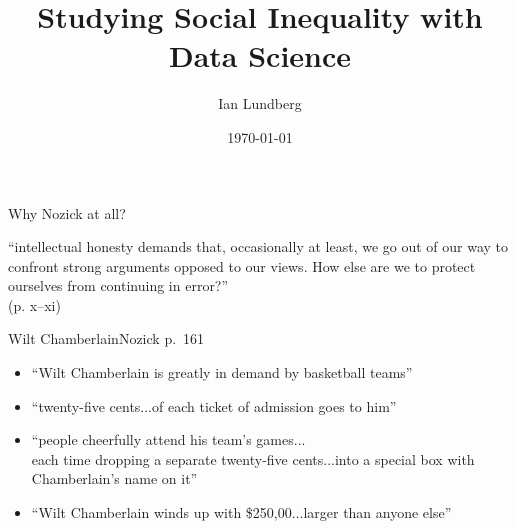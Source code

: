 \documentclass{beamer}
\title{Studying Social Inequality with Data Science}
\author{Ian Lundberg}
\date{\today}
\newcommand\bblue[1]{\textcolor{blue}{\textbf{#1}}}
\newcommand{\goalsframe}{\begin{frame}{Learning goals for today} \pause
By the end of class, you will be able to \vskip .1in
\begin{itemize}
    \item justify a minimal state \hfill (per Nozick) \vskip .1in \pause
    \item critique any more extensive state\\on the grounds of individual rights \hfill (per Nozick) \vskip .1in \pause
    \item draw contrasts between
    \begin{itemize}
    \item historical principles of justice \hfill Nozick
    \item end-state principles of justice \hfill Rawls
    \end{itemize} \vskip .1in \pause
    \item recognize how these different logics could\\both lead to redistribution today
    \begin{itemize}
    \item Example: Correcting past injustice
    \end{itemize}
\end{itemize} \vskip .2in
\end{frame}}
\begin{document}
\begin{frame}
\end{frame}


\begin{frame}{Why Nozick at all?} \pause

``intellectual honesty demands that, occasionally at least, we go out of our way to confront strong arguments opposed to our views. How else are we to protect ourselves from continuing in error?''\\(p. x--xi)

\end{frame}

\begin{frame}{Wilt Chamberlain}{Nozick p.~161} \pause

\begin{itemize}
\item ``Wilt Chamberlain is greatly in demand by basketball teams'' \pause
\item ``twenty-five cents...of each ticket of admission goes to him'' \pause
\item ``people cheerfully attend his team's games...\\each time dropping a separate twenty-five cents...into a special box with Chamberlain's name on it'' \pause
\item ``Wilt Chamberlain winds up with \$250,00...larger than anyone else''
\end{itemize}

\end{frame}
\end{document}
